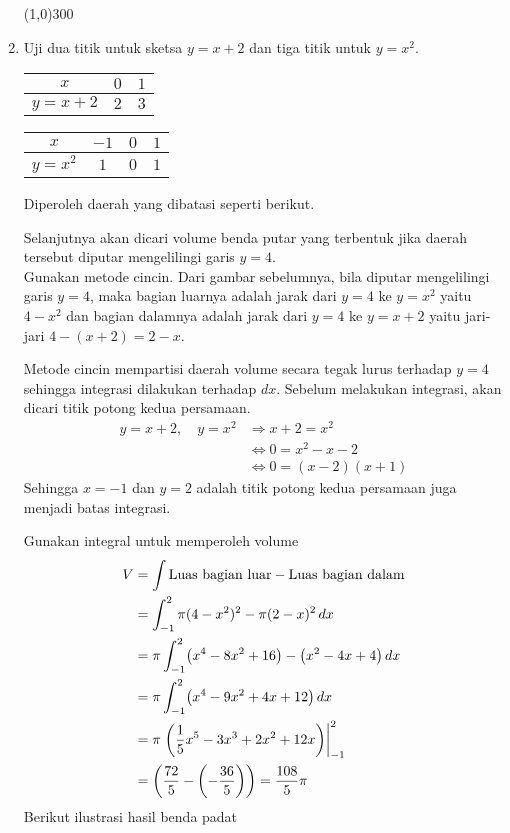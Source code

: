 \begin{enumerate}[leftmargin=*, label={\arabic*}.]
\begin{center}\line(1,0){300}\end{center}


\item Uji dua titik untuk sketsa $y=x+2$ dan tiga titik untuk $y=x^2$.
\begin{center}
    \begin{tabular}{|c|c|c|}\hline
        $x$  & $0$ & $1$ \\ \hline
        $y=x+2$ & $2$ & $3$ \\ \hline
    \end{tabular}\quad
    \begin{tabular}{|c|c|c|c|}\hline
        $x$ & $-1$ & $0$ & $1$ \\ \hline
        $y=x^{2}$ & $1$ & $0$ & $1$ \\ \hline
    \end{tabular}
\end{center}
Diperoleh daerah yang dibatasi seperti berikut.



Selanjutnya akan dicari volume benda putar yang terbentuk jika daerah tersebut diputar 
mengelilingi garis $y=4$.\\
Gunakan metode cincin. Dari gambar sebelumnya, bila diputar mengelilingi garis $y=4$, maka bagian 
luarnya adalah jarak dari $y=4$ ke $y=x^{2}$ yaitu $4-x^{2}$ dan bagian dalamnya adalah jarak 
dari $y=4$ ke $y=x+2$ yaitu jari-jari $4-(x+2)=2-x$. 

Metode cincin mempartisi daerah volume secara tegak lurus terhadap $y=4$ 
sehingga integrasi dilakukan terhadap $dx$. Sebelum melakukan integrasi, akan dicari titik potong 
kedua persamaan.
\begin{align*}
    y = x+2,\quad y = x^{2} &\Longrightarrow x+2= x^{2}\\
    &\iff 0 = x^{2}-x-2\\
    &\iff 0 = (x-2)(x+1)
\end{align*}
Sehingga $x = -1$ dan $y=2$ adalah titik potong kedua persamaan juga menjadi batas integrasi.

Gunakan integral untuk memperoleh volume
\begin{align*}
    V &= \int \text{Luas bagian luar} - \text{Luas bagian dalam}\\
    &=\int_{-1}^{2} \pi(4-x^2)^2 - \pi(2-x)^{2}\,dx \\
    &=\pi\int_{-1}^{2} \brk*{x^{4}-8x^{2}+16} - \brk*{x^{2}-4x+4}\,dx \\
    &=\pi\int_{-1}^{2} \brk*{x^{4}-9x^{2}+4x+12}\,dx \\
    &=\pi\eval{\frac{1}{5}x^{5}-3x^{3}+2x^{2}+12x}{-1}{2} \\
    &= \brk*{\frac{72}{5}-\brk*{-\frac{36}{5}}}=\frac{108}{5}\pi
\end{align*}
Berikut ilustrasi hasil benda padat


\end{enumerate}
